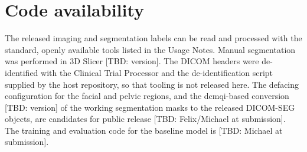 
\section*{Code availability}\label{sec:code}

The released imaging and segmentation labels can be read and processed with the standard, openly available tools listed in the Usage Notes.
Manual segmentation was performed in 3D Slicer [TBD: version].
The DICOM headers were de-identified with the Clinical Trial Processor and the de-identification script supplied by the host repository, so that tooling is not released here.
The defacing configuration for the facial and pelvic regions, and the dcmqi-based conversion~\cite{Herz_2017} [TBD: version] of the working segmentation masks to the released DICOM-SEG objects, are candidates for public release [TBD: Felix/Michael at submission].
The training and evaluation code for the baseline model is [TBD: Michael at submission].
